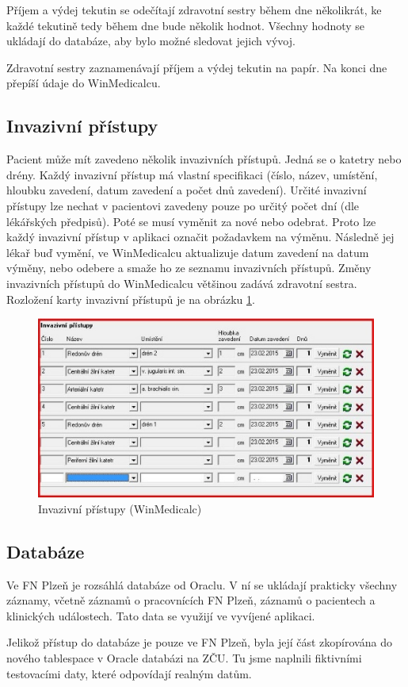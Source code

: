 Příjem a výdej tekutin se odečítají zdravotní sestry během dne několikrát, ke každé tekutině tedy během dne bude několik hodnot. Všechny hodnoty se ukládají do databáze, aby bylo možné sledovat jejich vývoj.

Zdravotní sestry zaznamenávají příjem a výdej tekutin na papír. Na konci dne přepíší údaje do WinMedicalcu.

\subsection{Invazivní přístupy}

Pacient může mít zavedeno několik invazivních přístupů. Jedná se o katetry nebo drény. Každý invazivní přístup má vlastní specifikaci (číslo, název, umístění, hloubku zavedení, datum zavedení a počet dnů zavedení). Určité invazivní přístupy lze nechat v pacientovi zavedeny pouze po určitý počet dní (dle lékářských předpisů). Poté se musí vyměnit za nové nebo odebrat. Proto lze každý invazivní přístup v aplikaci označit požadavkem na výměnu. Následně jej lékař buď vymění, ve WinMedicalcu aktualizuje datum zavedení na datum výměny, nebo odebere a smaže ho ze seznamu invazivních přístupů. Změny invazivních přístupů do WinMedicalcu většinou zadává zdravotní sestra. Rozložení karty invazivní přístupů je na obrázku \ref{fig:WM_invazivni_pristupy}.

\begin{figure}[H]
	\centering
	\includegraphics[width=1\textwidth]{img/medicalc/WM_invazivni_pristupy.eps}
	\caption{Invazivní přístupy (WinMedicalc)}
  \label{fig:WM_invazivni_pristupy}
\end{figure}


\subsection{Databáze}

Ve FN Plzeň je rozsáhlá databáze od Oraclu. V ní se ukládají prakticky všechny záznamy, včetně záznamů o pracovnících FN Plzeň, záznamů o pacientech a klinických událostech. Tato data se využijí ve vyvíjené aplikaci.

Jelikož přístup do databáze je pouze ve FN Plzeň, byla její část zkopírována do nového tablespace v Oracle databázi na ZČU. Tu jsme naplnili fiktivními testovacími daty, které odpovídají realným datům.